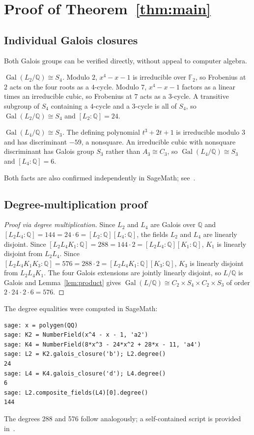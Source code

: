 \documentclass[12pt]{amsart}
\DeclareMathOperator{\Gal}{Gal}
\newcommand{\Q}{\mathbb{Q}}
\begin{document}
\section{Proof of Theorem~\ref{thm:main}}\label{sec:proof}

\subsection{Individual Galois closures}
Both Galois groups can be verified directly, without appeal to computer
algebra.

\emph{$\Gal(L_2/\Q)\cong S_4$.} Modulo $2$, $x^4-x-1$ is irreducible over
$\mathbb{F}_2$, so Frobenius at $2$ acts on the four roots as a $4$-cycle.
Modulo $7$, $x^4-x-1$ factors as a linear times an irreducible cubic, so
Frobenius at $7$ acts as a $3$-cycle. A transitive subgroup of $S_4$
containing a $4$-cycle and a $3$-cycle is all of $S_4$, so
$\Gal(L_2/\Q)\cong S_4$ and $[L_2:\Q]=24$.

\emph{$\Gal(L_4/\Q)\cong S_3$.} The defining polynomial $t^3+2t+1$ is
irreducible modulo $3$ and has discriminant $-59$, a nonsquare. An
irreducible cubic with nonsquare discriminant has Galois
group $S_3$ rather than $A_3\cong C_3$, so $\Gal(L_4/\Q)\cong S_3$ and
$[L_4:\Q]=6$.

Both facts are also confirmed independently in SageMath; see~\cite{HFGcode}.

\subsection{Degree-multiplication proof}\label{sec:degree}

\begin{proof}[Proof via degree multiplication]
Since $L_2$ and $L_4$ are Galois over $\Q$ and
$[L_2 L_4:\Q]=144=24\cdot 6=[L_2:\Q][L_4:\Q]$, the fields $L_2$ and
$L_4$ are linearly disjoint. Since
$[L_2 L_4 K_1:\Q]=288=144\cdot 2=[L_2 L_4:\Q][K_1:\Q]$,
$K_1$ is linearly disjoint from $L_2 L_4$. Since
$[L_2 L_4 K_1 K_3:\Q]=576=288\cdot 2=[L_2 L_4 K_1:\Q][K_3:\Q]$,
$K_3$ is linearly disjoint from $L_2 L_4 K_1$. The four Galois
extensions are jointly linearly disjoint, so $L/\Q$ is Galois and
Lemma~\ref{lem:product} gives
$\Gal(L/\Q)\cong C_2\times S_4\times C_2\times S_3$ of order
$2\cdot 24\cdot 2\cdot 6=576$.
\end{proof}

The degree equalities were computed in SageMath:
\begin{verbatim}
sage: x = polygen(QQ)
sage: K2 = NumberField(x^4 - x - 1, 'a2')
sage: K4 = NumberField(8*x^3 - 24*x^2 + 28*x - 11, 'a4')
sage: L2 = K2.galois_closure('b'); L2.degree()
24
sage: L4 = K4.galois_closure('d'); L4.degree()
6
sage: L2.composite_fields(L4)[0].degree()
144
\end{verbatim}
The degrees 288 and 576 follow analogously; a self-contained script
is provided in~\cite{HFGcode}.
\end{document}
